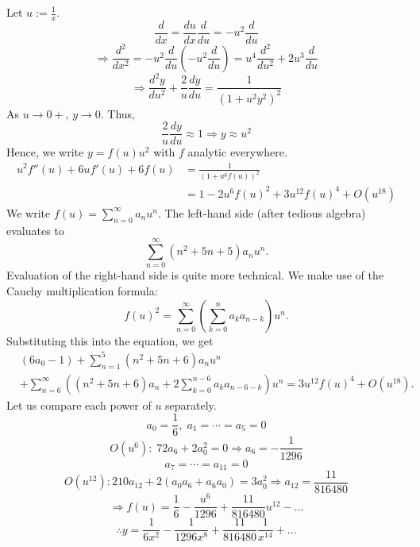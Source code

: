 \item
Let $u := \frac{1}{x}$.
\[
	\frac{d}{dx} = \frac{du}{dx}\frac{d}{du} = -u^2\frac{d}{du}
\]
\[
	\Rightarrow \frac{d^2}{dx^2} = -u^2\frac{d}{du} \left(-u^2 \frac{d}{du}\right)
	= u^4 \frac{d^2}{du^2} + 2u^3\frac{d}{du}
\]
\[
	\Rightarrow \frac{d^2 y}{du^2} + \frac{2}{u}\frac{dy}{du} = \frac{1}{{\left( 1 + u^2 y^2 \right)}^2}
\]
As $u \rightarrow 0+$, $y \rightarrow 0$. Thus,
\[
	\frac{2}{u}\frac{dy}{du} \approx 1
	\Rightarrow y \approx u^2
\]
Hence, we write $y = f(u) u^2$ with $f$ analytic everywhere.
\begin{align*}
	u^2 f''(u) + 6u f'(u) + 6f(u)
	&= \frac{1}{{\left( 1 + u^6 f(u) \right)}^2} \\
	&= 1 - 2u^6 {f(u)}^2 + 3u^{12} {f(u)}^4 + O\left( u^{18} \right)
\end{align*}
We write $f(u) = \sum_{n=0}^\infty a_n u^n$.
The left-hand side (after tedious algebra) evaluates to
\[
	\sum_{n=0}^\infty \left( n^2 + 5n + 5 \right) a_n u^n.
\]
Evaluation of the right-hand side is quite more technical.
We make use of the Cauchy multiplication formula:
\[
	{f(u)}^2 = \sum_{n=0}^\infty \left( \sum_{k=0}^n a_k a_{n - k} \right) u^n.
\]
Substituting this into the equation, we get
\begin{align*}
	&(6a_0 - 1)
	 + \sum_{n=1}^5 \left( n^2 + 5n + 6 \right) a_n u^n \\
	&+ \sum_{n=6}^\infty \left( \left( n^2 + 5n + 6 \right) a_n + 2 \sum_{k=0}^{n - 6} a_k a_{n - 6 - k} \right) u^n
	= 3u^{12} {f(u)}^4 + O(u^{18}).
\end{align*}
Let us compare each power of $u$ separately.
\[
	a_0 = \frac{1}{6},\; a_1 = \cdots = a_5 = 0
\]
\[
	O(u^6):\; 72a_6 + 2a_0^2 = 0
	\Rightarrow a_6 = -\frac{1}{1296}
\]
\[
	a_7 = \cdots = a_{11} = 0
\]
\[
	O(u^{12}): 210a_{12} + 2 \left( a_0 a_6 + a_6 a_0 \right) = 3a_0^2
	\Rightarrow a_{12} = \frac{11}{816480}
\]
\[
	\Rightarrow f(u) = \frac{1}{6} - \frac{u^6}{1296} + \frac{11}{816480}u^{12} - \dots
\]
\[
	\therefore y = \frac{1}{6x^2} - \frac{1}{1296x^8} + \frac{11}{816480}\frac{1}{x^{14}} + \dots
\]